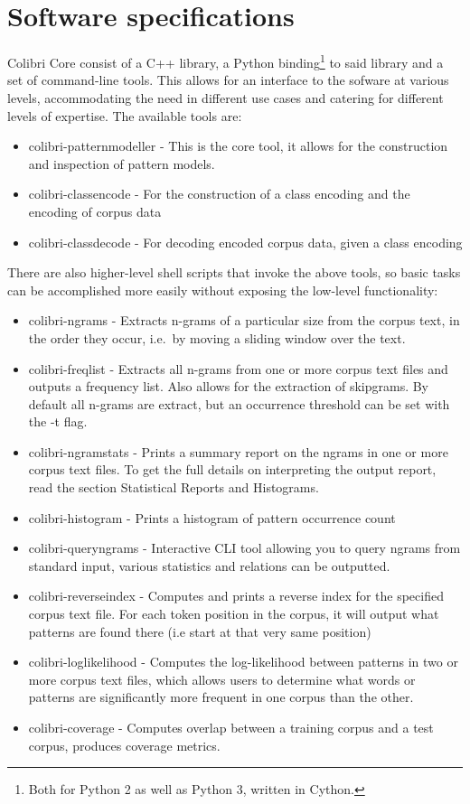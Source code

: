 \section{Software specifications}

Colibri Core consist of a C++ library, a Python binding\footnote{Both for
Python 2 as well as Python 3, written in Cython.} to said library and a set of
command-line tools. This allows for an interface to the sofware at various
levels, accommodating the need in different use cases and catering for
different levels of expertise. The available tools are:

\begin{itemize}
    \item colibri-patternmodeller - This is the core tool, it allows for the
        construction and inspection of pattern models.
    \item colibri-classencode - For the construction of a class encoding and
        the encoding of corpus data
    \item colibri-classdecode - For decoding encoded corpus data, given a class
        encoding
\end{itemize}

There are also higher-level shell scripts that invoke the above tools, so basic
tasks can be accomplished more easily without exposing the low-level functionality:

\begin{itemize}
    \item colibri-ngrams - Extracts n-grams of a particular size from the
        corpus text, in the order they occur, i.e.\ by moving a sliding window over the text.
    \item colibri-freqlist - Extracts all n-grams from one or more corpus text files and outputs a frequency list. Also allows for the extraction of skipgrams. By default all n-grams are extract, but an occurrence threshold can be set with the -t flag.
    \item colibri-ngramstats - Prints a summary report on the ngrams in one or more corpus text files. To get the full details on interpreting the output report, read the section Statistical Reports and Histograms.
    \item colibri-histogram - Prints a histogram of pattern occurrence count
    \item colibri-queryngrams - Interactive CLI tool allowing you to query ngrams from standard input, various statistics and relations can be outputted.
    \item colibri-reverseindex - Computes and prints a reverse index for the specified corpus text file. For each token position in the corpus, it will output what patterns are found there (i.e start at that very same position)
    \item colibri-loglikelihood - Computes the log-likelihood between patterns in two or more corpus text files, which allows users to determine what words or patterns are significantly more frequent in one corpus than the other.
    \item colibri-coverage - Computes overlap between a training corpus and a test corpus, produces coverage metrics.
\end{itemize}


